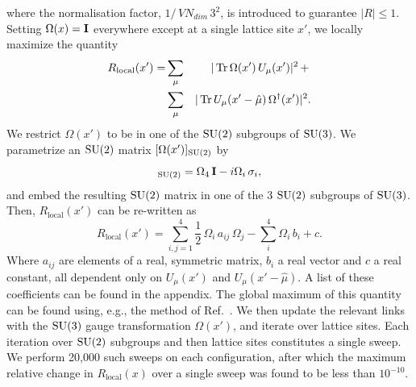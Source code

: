 \documentclass[
 reprint,
 amsmath,amssymb,
 aps,
prd,
]{revtex4-1}
\begin{document}
where the normalisation factor, $1 /\, VN_{dim}\,3^{2}$, is introduced to guarantee $|R| \le 1$. Setting $\Omega(x) = {\bf I}$ everywhere except at a single lattice site $x'$, we locally maximize the quantity
\begin{eqnarray}
R_{\textrm{local}}(x') = &\sum_{\mu}&|\, \mathrm{Tr} \, \Omega(x')\,U_{\mu}(x')|^{2} \,+\,  \\ \nonumber
&\sum_{\mu}&|\, \mathrm{Tr} \, U_{\mu}(x' - \hat{\mu})\,\Omega^{\dagger}(x')|^{2}.
\end{eqnarray}
We restrict $\Omega(x')$ to be in one of the $\mathrm{SU}(2)$ subgroups of $\mathrm{SU}(3)$. We parametrize an $\mathrm{SU}(2)$ matrix $[\Omega(x')]_{\mathrm{SU}(2)}$ by
\begin{equation}
[\Omega(x')]_{\SU{2}} = \Omega_{4}\,\identity - i\Omega_{i}\,\sigma_{i},
\end{equation}
and embed the resulting $\mathrm{SU}(2)$ matrix in one of the 3 $\mathrm{SU}(2)$ subgroups of $\mathrm{SU}(3)$. Then, $R_{\textrm{local}}(x')$ can be re-written as
\begin{equation}
R_{\textrm{local}}(x') = \sum_{i,j=1}^{4} \frac{1}{2}\,\Omega_{i}\,a_{ij}\,\Omega_{j} - \sum_{i}^{4}\Omega_{i}\,b_{i} + c.
\end{equation}
Where $a_{ij}$ are elements of a real, symmetric matrix, $b_{i}$ a real vector and $c$ a real constant, all dependent only on $U_{\mu}(x')$ and $U_{\mu}(x' - \hat{\mu})$. A list of these coefficients can be found in the appendix. The global maximum of this quantity can be found using, e.g., the method of Ref.~\cite{QCQPpaper}. We then update the relevant links with the $\mathrm{SU}(3)$ gauge transformation $\Omega(x')$, and iterate over lattice sites. Each iteration over $\mathrm{SU}(2)$ subgroups and then lattice sites constitutes a single sweep. We perform 20,000 such sweeps on each configuration, after which the maximum relative change in $R_{\textrm{local}}(x)$ over a single sweep was found to be less than $10^{-10}$. \par
\end{document}
